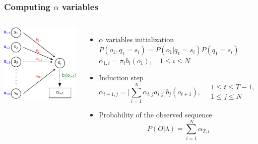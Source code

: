 \begin{frame}
  \frametitle{Computing $\alpha$ variables}
  \begin{columns}
    \includegraphics[width=\textwidth]{graphics/forward.pdf}
    \begin{itemize}
    \item $\alpha$ variables initialization \\
      $P(o_1,q_1=s_i) = P(o_1 \vert q_1=s_i)P(q_1=s_i)$ \\
      $\alpha_{1,i}=\pi_ib_i(o_1), \quad 1 \le i \le N$ \pause
    \item Induction step
      \begin{equation*}
        \label{eq:alpha_induct}
        \alpha_{t+1,j}=\Big[ \displaystyle\sum_{i=1}^{N}\alpha_{t,j}a_{i,j}\Big] b_{j}(o_{t+1}), \quad \substack{1 \le t \le T-1, \\ 1 \le j \le N}
      \end{equation*}
    \item Probability of the observed sequence
      \begin{equation*}
        \label{eq:alpha_term}
        P(O \vert \lambda) = \displaystyle\sum_{i=1}^{N}\alpha_{T,i}
      \end{equation*}
    \end{itemize}
  \end{columns}
\end{frame}

